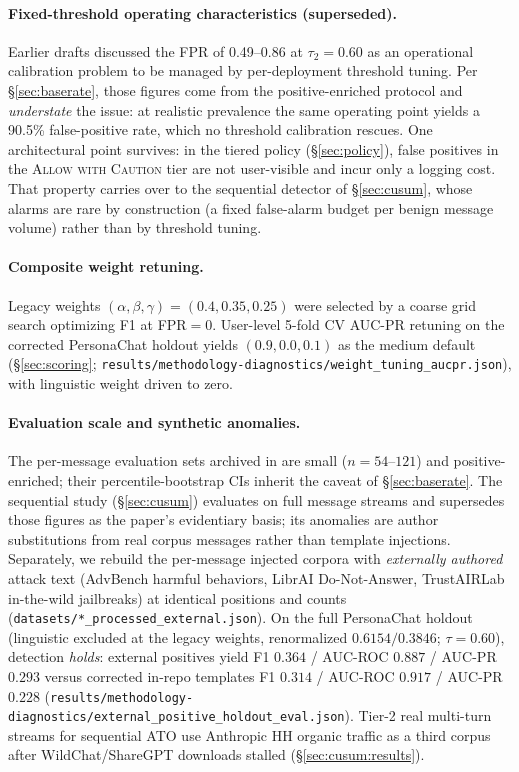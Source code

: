 \documentclass[conference]{IEEEtran}
\begin{document}
\paragraph{Fixed-threshold operating characteristics (superseded).}
Earlier drafts discussed the FPR of 0.49--0.86 at $\tau_2{=}0.60$ as an operational
calibration problem to be managed by per-deployment threshold tuning.
Per \S\ref{sec:baserate}, those figures come from the positive-enriched protocol and
\emph{understate} the issue: at realistic prevalence the same operating point yields
a 90.5\% false-positive rate, which no threshold calibration rescues.
One architectural point survives: in the tiered policy (\S\ref{sec:policy}), false
positives in the \textsc{Allow with Caution} tier are not user-visible and incur
only a logging cost.
That property carries over to the sequential detector of \S\ref{sec:cusum}, whose
alarms are rare by construction (a fixed false-alarm budget per benign message
volume) rather than by threshold tuning.

\paragraph{Composite weight retuning.}
Legacy weights $(\alpha, \beta, \gamma) = (0.4, 0.35, 0.25)$ were selected by a coarse
grid search optimizing F1 at FPR$=$0.
User-level 5-fold CV AUC-PR retuning on the corrected PersonaChat holdout yields
$(0.9, 0.0, 0.1)$ as the medium default (\S\ref{sec:scoring};
\texttt{results/methodology-diagnostics/weight\_tuning\_aucpr.json}), with linguistic weight driven to zero.

\paragraph{Evaluation scale and synthetic anomalies.}
The per-message evaluation sets archived in  are small
($n{=}54$--$121$) and positive-enriched; their percentile-bootstrap CIs inherit the
caveat of \S\ref{sec:baserate}.
The sequential study (\S\ref{sec:cusum}) evaluates on full message streams and
supersedes those figures as the paper's evidentiary basis; its anomalies are author
substitutions from real corpus messages rather than template injections.
Separately, we rebuild the per-message injected corpora with
\emph{externally authored} attack text (AdvBench harmful behaviors, LibrAI
Do-Not-Answer, TrustAIRLab in-the-wild jailbreaks) at identical positions and
counts (\texttt{datasets/*\_processed\_external.json}).
On the full PersonaChat holdout (linguistic excluded at the legacy weights,
renormalized $0.6154/0.3846$; $\tau{=}0.60$), detection \emph{holds}: external
positives yield F1 $0.364$ / AUC-ROC $0.887$ / AUC-PR
$0.293$ versus corrected in-repo templates F1 $0.314$ / AUC-ROC $0.917$ / AUC-PR
$0.228$ (\texttt{results/methodology-diagnostics/external\_positive\_holdout\_eval.json}).
Tier-2 real multi-turn streams for sequential ATO use Anthropic HH organic traffic
as a third corpus after WildChat/ShareGPT downloads stalled
(\S\ref{sec:cusum:results}).
\end{document}
